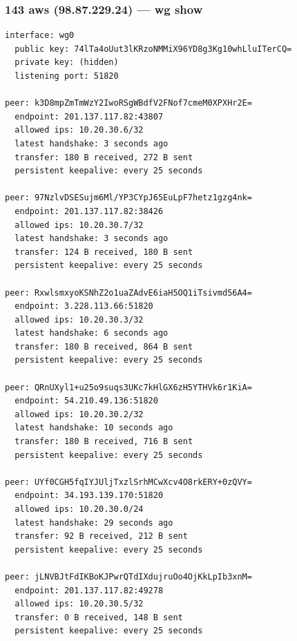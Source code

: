 \documentclass[11pt,a4paper]{article}
\begin{document}
\subsubsection*{143 aws (98.87.229.24) — wg show}
\begin{lstlisting}
interface: wg0
  public key: 74lTa4oUut3lKRzoNMMiX96YD8g3Kg10whLluITerCQ=
  private key: (hidden)
  listening port: 51820

peer: k3D8mpZmTmWzY2IwoRSgWBdfV2FNof7cmeM0XPXHr2E=
  endpoint: 201.137.117.82:43807
  allowed ips: 10.20.30.6/32
  latest handshake: 3 seconds ago
  transfer: 180 B received, 272 B sent
  persistent keepalive: every 25 seconds

peer: 97NzlvDSESujm6Ml/YP3CYpJ65EuLpF7hetz1gzg4nk=
  endpoint: 201.137.117.82:38426
  allowed ips: 10.20.30.7/32
  latest handshake: 3 seconds ago
  transfer: 124 B received, 180 B sent
  persistent keepalive: every 25 seconds

peer: RxwlsmxyoKSNhZ2o1uaZAdvE6iaH5OQ1iTsivmd56A4=
  endpoint: 3.228.113.66:51820
  allowed ips: 10.20.30.3/32
  latest handshake: 6 seconds ago
  transfer: 180 B received, 864 B sent
  persistent keepalive: every 25 seconds

peer: QRnUXyl1+u25o9suqs3UKc7kHlGX6zH5YTHVk6r1KiA=
  endpoint: 54.210.49.136:51820
  allowed ips: 10.20.30.2/32
  latest handshake: 10 seconds ago
  transfer: 180 B received, 716 B sent
  persistent keepalive: every 25 seconds

peer: UYf0CGH5fqIYJUljTxzlSrhMCwXcv4O8rkERY+0zQVY=
  endpoint: 34.193.139.170:51820
  allowed ips: 10.20.30.0/24
  latest handshake: 29 seconds ago
  transfer: 92 B received, 212 B sent
  persistent keepalive: every 25 seconds

peer: jLNVBJtFdIKBoKJPwrQTdIXdujruOo4OjKkLpIb3xnM=
  endpoint: 201.137.117.82:49278
  allowed ips: 10.20.30.5/32
  transfer: 0 B received, 148 B sent
  persistent keepalive: every 25 seconds

\end{lstlisting}
\end{document}
